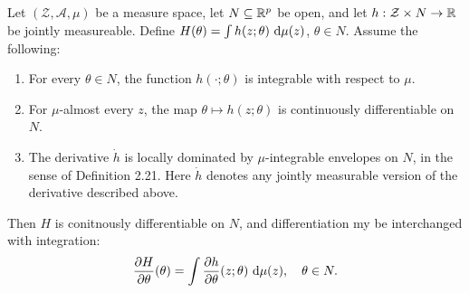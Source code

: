 \begin{proposition*}

  Let $(\mathcal{Z}, \mathcal{A}, \mu)$ be a measure space, let $N \subseteq  \mathbb{R}^{p}$ be open, and
  let $h: \mathcal{Z}\times  N \to \mathbb{R}$ be jointly measureable. Define $H(\theta) = \int h(z;\theta)
  \text{ d} \mu (z)$,  $\theta \in N$. Assume the following:
  \begin{enumerate}
  \item For every $\theta \in N$, the function $h(\cdot ;\theta)$ is integrable with respect to $\mu$.
  \item For $\mu$-almost every $z$, the map $\theta \mapsto h(z;\theta)$ is continuously
    differentiable on $N$.
  \item The derivative $\dot h$ is locally dominated by $\mu$-integrable envelopes on $N$, in the
    sense of Definition 2.21. Here $\dot h$ denotes any jointly measurable version of the derivative
    described above.
  \end{enumerate}
  Then $H$ is conitnously differentiable on $N$, and differentiation my be interchanged with
  integration:
  \[ 
  \frac{\partial H}{\partial \theta} (\theta) = \int \frac{\partial h}{\partial \theta} (z;\theta)
  \text{ d} \mu(z), \quad  \theta \in N
  .\]
\end{proposition*}

